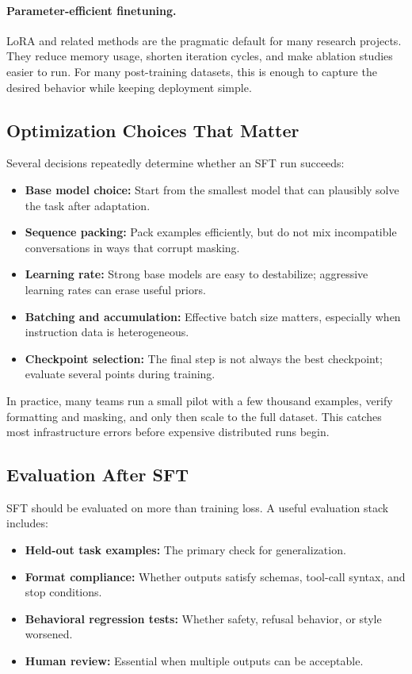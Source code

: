\documentclass[class=article,crop=false]{standalone}
\begin{document}
\paragraph{Parameter-efficient finetuning.}
LoRA and related methods are the pragmatic default for many research projects. They reduce memory usage, shorten iteration cycles, and make ablation studies easier to run. For many post-training datasets, this is enough to capture the desired behavior while keeping deployment simple.

\subsection{Optimization Choices That Matter}
\label{sec:sft:optimization}

Several decisions repeatedly determine whether an SFT run succeeds:
\begin{itemize}
  \item \textbf{Base model choice:} Start from the smallest model that can plausibly solve the task after adaptation.
  \item \textbf{Sequence packing:} Pack examples efficiently, but do not mix incompatible conversations in ways that corrupt masking.
  \item \textbf{Learning rate:} Strong base models are easy to destabilize; aggressive learning rates can erase useful priors.
  \item \textbf{Batching and accumulation:} Effective batch size matters, especially when instruction data is heterogeneous.
  \item \textbf{Checkpoint selection:} The final step is not always the best checkpoint; evaluate several points during training.
\end{itemize}

In practice, many teams run a small pilot with a few thousand examples, verify formatting and masking, and only then scale to the full dataset. This catches most infrastructure errors before expensive distributed runs begin.

\subsection{Evaluation After SFT}
\label{sec:sft:evaluation}

SFT should be evaluated on more than training loss. A useful evaluation stack includes:
\begin{itemize}
  \item \textbf{Held-out task examples:} The primary check for generalization.
  \item \textbf{Format compliance:} Whether outputs satisfy schemas, tool-call syntax, and stop conditions.
  \item \textbf{Behavioral regression tests:} Whether safety, refusal behavior, or style worsened.
  \item \textbf{Human review:} Essential when multiple outputs can be acceptable.
\end{itemize}
\end{document}
